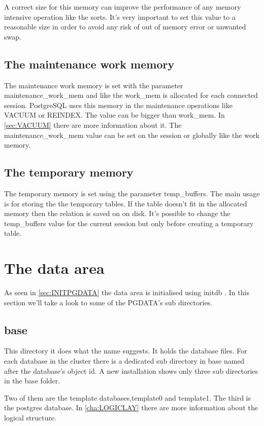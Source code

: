 A correct size for this memory can improve the performance of any memory intensive operation like
the sorts. It's very important to set this value to a reasonable size in order to avoid any risk of 
out of memory error or unwanted swap.\newline


\subsection{The maintenance work memory}
The maintenance work memory is set with the parameter maintenance\_work\_mem and like the work\_mem
is allocated for each connected session. PostgreSQL uses this memory in the maintenance operations 
like VACUUM or REINDEX. The value can be bigger than work\_mem. In \ref{sec:VACUUM}
there are more information about it. The maintenance\_work\_mem value can be set on the session or
globally like the work memory.

\subsection{The temporary memory}
\label{sub:TEMPBUF}
The temporary memory is set using the parameter temp\_buffers. The main usage is for storing the the
temporary tables. If the table doesn't fit in the allocated memory then the relation is saved
on on disk. It's possible to change the temp\_buffers value for the current session but only before
creating a temporary table.


\section{The data area}
\label{sec:PGDATA}
As seen in \ref{sec:INITPGDATA} the data area is initialised using initdb . In this
section we'll take a look to some of the PGDATA's sub directories.


\subsection{base}
\label{sub:BASE}
This directory it does what the name suggests. It holds the database files. For each database in the
cluster there is a dedicated sub directory in base named after the database's object id.
A new installation shows only three sub directories in the base folder.\newline

Two of them are the template databases,template0 and template1. The third is the postgres database.
In \ref{cha:LOGICLAY}  there are more information about the logical structure.\newline

